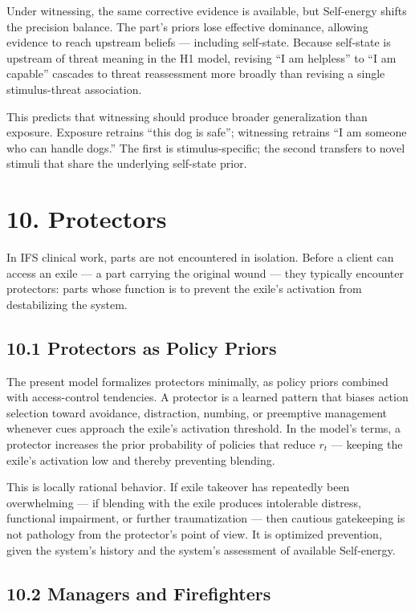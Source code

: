 \documentclass[11pt]{article}
\begin{document}
Under witnessing, the same corrective evidence is available, but
Self-energy shifts the precision balance. The part's priors lose
effective dominance, allowing evidence to reach upstream beliefs ---
including self-state. Because self-state is upstream of threat meaning
in the H1 model, revising ``I am helpless'' to ``I am capable'' cascades
to threat reassessment more broadly than revising a single
stimulus-threat association.

This predicts that witnessing should produce broader generalization than
exposure. Exposure retrains ``this dog is safe''; witnessing retrains
``I am someone who can handle dogs.'' The first is stimulus-specific;
the second transfers to novel stimuli that share the underlying
self-state prior.

\section{10. Protectors}\label{protectors}

In IFS clinical work, parts are not encountered in isolation. Before a
client can access an exile --- a part carrying the original wound ---
they typically encounter protectors: parts whose function is to prevent
the exile's activation from destabilizing the system.

\subsection{10.1 Protectors as Policy
Priors}\label{protectors-as-policy-priors}

The present model formalizes protectors minimally, as policy priors
combined with access-control tendencies. A protector is a learned
pattern that biases action selection toward avoidance, distraction,
numbing, or preemptive management whenever cues approach the exile's
activation threshold. In the model's terms, a protector increases the
prior probability of policies that reduce \(r_t\) --- keeping the
exile's activation low and thereby preventing blending.

This is locally rational behavior. If exile takeover has repeatedly been
overwhelming --- if blending with the exile produces intolerable
distress, functional impairment, or further traumatization --- then
cautious gatekeeping is not pathology from the protector's point of
view. It is optimized prevention, given the system's history and the
system's assessment of available Self-energy.

\subsection{10.2 Managers and
Firefighters}\label{managers-and-firefighters}
\end{document}
